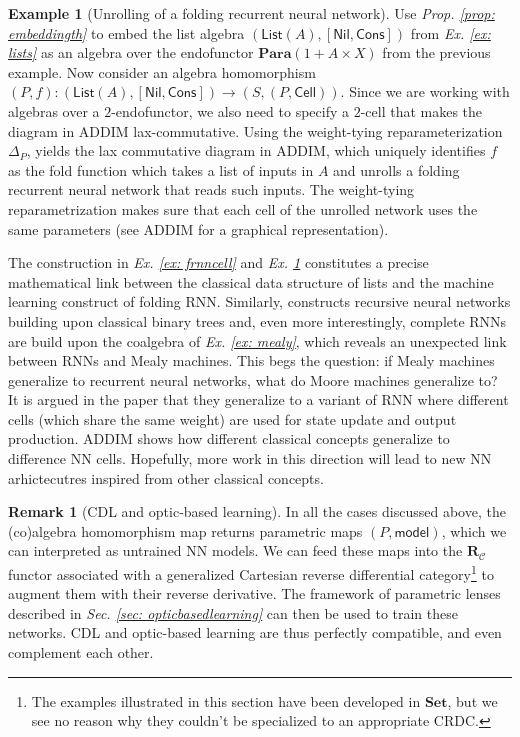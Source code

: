 \documentclass[11pt,a4paper,openright,twoside]{report}
\theoremstyle{plain}
\theoremstyle{definition}
\newtheorem{remark}[proposition]{Remark}
\newtheorem{example}[proposition]{Example}
\begin{document}
\begin{example}[Unrolling of a folding recurrent neural network]
  \label{ex: frnnunroll}
  Use \textit{Prop. \ref{prop: embeddingth}} to embed the list algebra $(\mathsf{List}(A), [\mathsf{Nil}, \mathsf{Cons}])$ from \textit{Ex. \ref{ex: lists}} as an algebra over the endofunctor $\mathbf{Para}(1 + A \times X)$ from the previous example. Now consider an algebra homomorphism $(P,f): (\mathsf{List}(A), [\mathsf{Nil}, \mathsf{Cons}]) \to (S,(P,\mathsf{Cell}))$. Since we are working with algebras over a $2$-endofunctor, we also need to specify a $2$-cell that makes the diagram in ADDIM lax-commutative. Using the weight-tying reparameterization $\Delta_P$, yields the lax commutative diagram in ADDIM, which uniquely identifies $f$ as the fold function which takes a list of inputs in $A$ and unrolls a folding recurrent neural network that reads such inputs. The weight-tying reparametrization makes sure that each cell of the unrolled network uses the same parameters (see ADDIM for a graphical representation). 
\end{example}


The construction in  \textit{Ex. \ref{ex: frnncell}} and \textit{Ex. \ref{ex: frnnunroll}} constitutes a precise mathematical link between the classical data structure of lists and the machine learning construct of folding RNN. Similarly, \cite{gavranovicposition} constructs recursive neural networks building upon classical binary trees and, even more interestingly, complete RNNs are build upon the coalgebra of \textit{Ex. \ref{ex: mealy}}, which reveals an unexpected link between RNNs and Mealy machines. This begs the question: if Mealy machines generalize to recurrent neural networks, what do Moore machines generalize to? It is argued in the paper that they generalize to a variant of RNN where different cells (which share the same weight) are used for state update and output production. ADDIM shows how different classical concepts generalize to difference NN cells. Hopefully, more work in this direction will lead to new NN arhictecutres inspired from other classical concepts.

\begin{remark}[CDL and optic-based learning]
  In all the cases discussed above, the (co)algebra homomorphism map returns parametric maps $(P,\mathsf{model})$, which we can interpreted as untrained NN models. We can feed these maps into the $\mathbf{R}_{\mathcal{C}}$ functor associated with a generalized Cartesian reverse differential category\footnote{The examples illustrated in this section have been developed in $\mathbf{Set}$, but we see no reason why they couldn't be specialized to an appropriate CRDC.} to augment them with their reverse derivative. The framework of parametric lenses described in 
  \textit{Sec. \ref{sec: opticbasedlearning}} can then be used to train these networks. CDL and optic-based learning are thus perfectly compatible, and even complement each other.
\end{remark}
\end{document}
